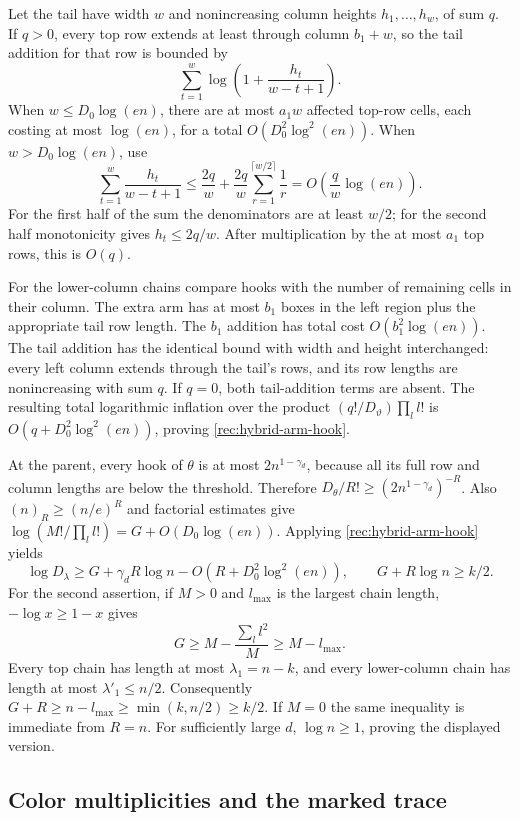 Let the tail have width $w$ and nonincreasing column heights
$h_1,\ldots,h_w$, of sum $q$. If $q>0$, every top row extends at
least through column $b_1+w$, so the tail addition for that row
is bounded by
\[
 \sum_{t=1}^w\log\left(1+\frac{h_t}{w-t+1}\right).
\]
When $w\le D_0\log(en)$, there are at most $a_1w$ affected top-row
cells, each costing at most $\log(en)$, for a total
$O(D_0^2\log^2(en))$. When $w>D_0\log(en)$, use
\[
 \sum_{t=1}^w\frac{h_t}{w-t+1}
 \le \frac{2q}{w}
       +\frac{2q}{w}\sum_{r=1}^{\lceil w/2\rceil}\frac1r
 =O\!\left(\frac q w\log(en)\right).
\]
For the first half of the sum the denominators are at least $w/2$;
for the second half monotonicity gives $h_t\le2q/w$.
After multiplication by the at most $a_1$ top rows, this is $O(q)$.

For the lower-column chains compare hooks with the number of
remaining cells in their column. The extra arm has at most $b_1$
boxes in the left region plus the appropriate tail row length.
The $b_1$ addition has total cost $O(b_1^2\log(en))$.
The tail addition has the identical bound with width and height
interchanged: every left column extends through the tail's rows,
and its row lengths are nonincreasing with sum $q$.
If $q=0$, both tail-addition terms are absent.
The resulting total logarithmic inflation over the product
$(q!/D_\vartheta)\prod_l l!$ is
$O(q+D_0^2\log^2(en))$, proving
\eqref{rec:hybrid-arm-hook}.

At the parent, every hook of $\theta$ is at most
$2n^{1-\gamma_d}$, because all its full row and column lengths
are below the threshold. Therefore
$D_\theta/R!\ge(2n^{1-\gamma_d})^{-R}$.
Also $(n)_R\ge(n/e)^R$ and factorial estimates give
$\log(M!/\prod_l l!)=G+O(D_0\log(en))$.
Applying \eqref{rec:hybrid-arm-hook} yields
\begin{equation}\label{rec:hybrid-arm-dimension}
 \log D_\lambda\ge
 G+\gamma_dR\log n-O(R+D_0^2\log^2(en)),
 \qquad G+R\log n\ge k/2 .
\end{equation}
For the second assertion, if $M>0$ and $l_{\max}$ is the largest
chain length, $-\log x\ge1-x$ gives
\[
 G\ge M-\frac{\sum_l l^2}{M}\ge M-l_{\max}.
\]
Every top chain has length at most $\lambda_1=n-k$, and every
lower-column chain has length at most $\lambda'_1\le n/2$.
Consequently
$G+R\ge n-l_{\max}\ge\min(k,n/2)\ge k/2$.
If $M=0$ the same inequality is immediate from $R=n$.
For sufficiently large $d$, $\log n\ge1$, proving the displayed
version.

\subsection{Color multiplicities and the marked trace}

